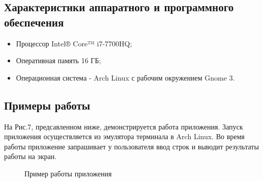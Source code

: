 \documentclass[a4paper,12pt]{article}
\begin{document}
\subsection{Характеристики аппаратного и программного обеспечения}
\begin{itemize}
\item Процессор Intel® Core™ i7-7700HQ;
\item Оперативная память 16 ГБ;
\item Операционная система - Arch Linux с рабочим окружением Gnome 3.
\end{itemize}

\newpage
\subsection{Примеры работы}
\begin{flushleft}
На Рис.7, предсавленном ниже, демонстрируется работа приложения. Запуск приложения осуществляется из эмулятора терминала в Arch Linux. Во время работы приложение запрашивает у пользователя ввод строк и выводит результаты работы на экран.
\end{flushleft}
\begin{figure}[h]
\caption{Пример работы приложения}
\label{images:example}
\end{figure}

\newpage
\end{document}

